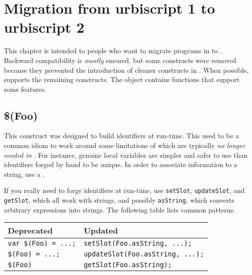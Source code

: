 
\chapter{Migration from urbiscript 1 to urbiscript 2}
\label{sec:k1}

This chapter is intended to people who want to migrate programs in  to .  Backward compatibility is \emph{mostly} ensured, but some
 constructs were removed because they prevented the introduction
of cleaner constructs in .  When possible,  supports the
remaining  constructs.  The  object contains
functions that support some  features.


\section{\$(Foo)}
\label{sec:k1:dollar}

This construct was designed to build identifiers at run-time.  This
used to be a common idiom to work around some limitations of 
which are typically \emph{no longer needed in }.  For instance,
genuine local variables are simpler and safer to use than identifiers
forged by hand to be unique.  In order to associate information to a
string, use a .

If you really need to forge identifiers at run-time, use
\lstinline{setSlot}, \lstinline{updateSlot}, and \lstinline{getSlot},
which all work with strings, and possibly \lstinline{asString}, which
converts arbitrary expressions into strings.  The
following table lists common patterns.

\begin{center}
  \begin{tabular}{|l|l|}
    \hline
    \textbf{Deprecated} & \textbf{Updated}  \\
    \hline
    \lstinline|var $(Foo) = ...;| & \lstinline|setSlot(Foo.asString, ...);|   \\
    \lstinline|$(Foo) = ...;|     & \lstinline|updateSlot(Foo.asString, ...);|\\
    \lstinline|$(Foo)|            & \lstinline|getSlot(Foo.asString);|\\
    \hline
  \end{tabular}%
\end{center}

